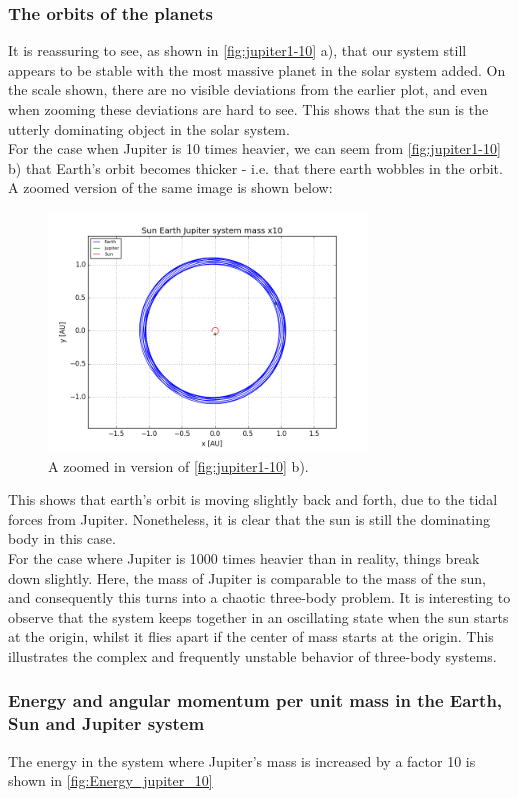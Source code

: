 \documentclass[a4paper, 10pt]{article}
\begin{document}
\subsubsection{The orbits of the planets}
It is reassuring to see, as shown in \cref{fig:jupiter1-10} a), that our system still appears to be stable with the most massive planet in the solar system added. On the scale shown, there are no visible deviations from the earlier plot, and even when zooming these deviations are hard to see. This shows that the sun is the utterly dominating object in the solar system.\\
\linebreak
For the case when Jupiter is 10 times heavier, we can seem from \cref{fig:jupiter1-10} b) that Earth's orbit becomes thicker - i.e. that there earth wobbles in the orbit. A zoomed version of the same image is shown below:
\begin{figure}[t!]
    \centering
    \includegraphics[height=2.5in]{orbitESJ10Close.png}
    \caption{A zoomed in version of \cref{fig:jupiter1-10} b).}
\end{figure}
This shows that earth's orbit is moving slightly back and forth, due to the tidal forces from Jupiter. Nonetheless, it is clear that the sun is still the dominating body in this case.\\
\linebreak
For the case where Jupiter is 1000 times heavier than in reality, things break down slightly. Here, the mass of Jupiter is comparable to the mass of the sun, and consequently this turns into a chaotic three-body problem. It is interesting to observe that the system keeps together in an oscillating state when the sun starts at the origin, whilst it flies apart if the center of mass starts at the origin. This illustrates the complex and frequently unstable behavior of three-body systems. 
\subsubsection{Energy and angular momentum per unit mass in the Earth, Sun and Jupiter system}
The energy in the system where Jupiter's mass is increased by a factor 10 is shown in \cref{fig:Energy_jupiter_10}
\end{document}
